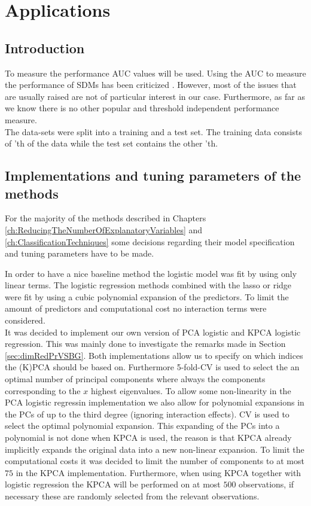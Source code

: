 \chapter{Applications}
\label{ch:Applications}
\section{Introduction}
To measure the performance AUC values will be used. Using the AUC to measure the performance of SDMs has been criticized \parencite{lobo_auc:_2008, jimenez-valverde_insights_2012}. However, most of the issues that are usually raised are not of particular interest in our case. Furthermore, as far as we know there is no other popular and threshold independent performance measure. \\

The data-sets were split into a training and a test set. The training data consists of 'th of the data while the test set contains the other 'th.\\

\section{Implementations and tuning parameters of the methods}
For the majority of the methods described in Chapters \ref{ch:ReducingTheNumberOfExplanatoryVariables} and \ref{ch:ClassificationTechniques} some decisions regarding their model specification and tuning parameters have to be made.

In order to have a nice baseline method the logistic model was fit by using only linear terms. The logistic regression methods combined with the lasso or ridge were fit by using a cubic polynomial expansion of the predictors. To limit the amount of predictors and computational cost no interaction terms were considered. \\

It was decided to implement our own version of PCA logistic and KPCA logistic regression. This was mainly done to investigate the remarks made in Section \ref{sec:dimRedPrVSBG}. Both implementations allow us to specify on which indices the (K)PCA should be based on. Furthermore 5-fold-CV is used to select the an optimal number of principal components where always the components corresponding to the $x$ highest eigenvalues. To allow some non-linearity in the PCA logistic regressin implementation we also allow for polynomial expansions in the PCs of up to the third degree (ignoring interaction effects). CV is used to select the optimal polynomial expansion. This expanding of the PCs into a polynomial is not done when KPCA is used, the reason is that KPCA already implicitly expands the original data into a new non-linear expansion. To limit the computational costs it was decided to limit the number of components to at most $75$ in the KPCA implementation. Furthermore, when using KPCA together with logistic regression the KPCA will be performed on at most $500$ observations, if necessary these are randomly selected from the relevant observations. \\

